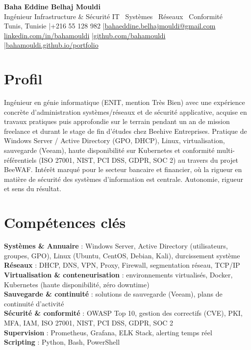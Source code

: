 \documentclass[a4paper,9pt]{article}
\begin{document}
\begin{center}
{\LARGE\bfseries\color{navy} Baha Eddine Belhaj Mouldi}\\[2pt]
{\normalsize\color{navy} Ingénieur Infrastructure \& Sécurité IT \textbar\ Systèmes \textbar\ Réseaux \textbar\ Conformité}\\[3pt]
{\small Tunis, Tunisie \quad|\quad +216 55 128 982 \quad|\quad \href{mailto:bahaeddine.belhajmouldi@gmail.com}{bahaeddine.belhajmouldi@gmail.com}}\\[1pt]
{\small \href{https://www.linkedin.com/in/bahamouldi}{linkedin.com/in/bahamouldi} \quad|\quad \href{https://github.com/bahamouldi}{github.com/bahamouldi} \quad|\quad \href{https://bahamouldi.github.io/portfolio/}{bahamouldi.github.io/portfolio}}
\end{center}
\vspace{1pt}
\section{Profil}
Ingénieur en génie informatique (ENIT, mention Très Bien) avec une expérience concrète d'administration systèmes/réseaux et de sécurité applicative, acquise en travaux pratiques puis approfondie sur le terrain pendant un an de mission freelance et durant le stage de fin d'études chez Beehive Entreprises. Pratique de Windows Server / Active Directory (GPO, DHCP), Linux, virtualisation, sauvegarde (Veeam), haute disponibilité sur Kubernetes et conformité multi-référentiels (ISO 27001, NIST, PCI DSS, GDPR, SOC 2) au travers du projet BeeWAF. Intérêt marqué pour le secteur bancaire et financier, où la rigueur en matière de sécurité des systèmes d'information est centrale. Autonomie, rigueur et sens du résultat.
\section{Compétences clés}
\textbf{Systèmes \& Annuaire} : Windows Server, Active Directory (utilisateurs, groupes, GPO), Linux (Ubuntu, CentOS, Debian, Kali), durcissement système\\[0.3pt]
\textbf{Réseaux} : DHCP, DNS, VPN, Proxy, Firewall, segmentation réseau, TCP/IP\\[0.3pt]
\textbf{Virtualisation \& conteneurisation} : environnements virtualisés, Docker, Kubernetes (haute disponibilité, zéro downtime)\\[0.3pt]
\textbf{Sauvegarde \& continuité} : solutions de sauvegarde (Veeam), plans de continuité d'activité\\[0.3pt]
\textbf{Sécurité \& conformité} : OWASP Top 10, gestion des correctifs (CVE), PKI, MFA, IAM, ISO 27001, NIST, PCI DSS, GDPR, SOC 2\\[0.3pt]
\textbf{Supervision} : Prometheus, Grafana, ELK Stack, alerting temps réel\\[0.3pt]
\textbf{Scripting} : Python, Bash, PowerShell
\end{document}
